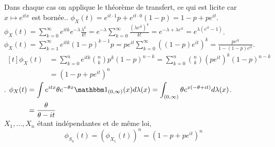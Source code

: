 \documentclass{report}
\begin{document}
\subsection{} \noindent{}\\ 
\\ 
\\
\noindent Dans chaque cas on applique le théorème de transfert, ce qui est licite car $x\mapsto e^{itx}$ est bornée.. $\phi_X(t)=e^{it\cdot 1}p + e^{it\cdot 0}(1-p)=1-p + pe^{it}$. $\phi_X(t)=\sum_{k=0}^\infty e^{itk} e^{-\lambda} \frac{\lambda^k}{k!}=e^{-\lambda} \sum_{k=0}^\infty \frac{(\lambda e^{it})^k}{k!}=e^{-\lambda+\lambda e^{it}}=e^{\lambda(e^{it}-1)}$. $\phi_X(t)=\sum_{k=1}^\infty e^{itk} (1-p)^{k-1}p= pe^{it}\sum_{k=0}^\infty ((1-p)e^{it})^k=\frac{pe^{it}}{1-(1-p)e^{it}}$. $\begin{aligned}[t] \phi_X(t)&=\sum_{k=0}^n e^{itk} \binom{n}k p^k(1-p)^{n-k} = \sum_{k=0}^n \binom{n}k (pe^{it})^k(1-p)^{n-k} \\&= (1-p+pe^{it})^n \end{aligned}$. $\begin{aligned}[t] \phi_X(t)&= \int e^{itx}\theta e^{-\theta x} \mathbbm 1_{(0,\infty)}(x) d\lambda(x) 
= \int_{(0,\infty)} \theta e^{x(-\theta +it)}d\lambda(x) \\
&=\frac{\theta}{\theta -it}
\end{aligned}$. $X_1,\ldots,X_n$ étant indépendantes et de même loi, $$\phi_{S_n}(t)=(\phi_{X_1}(t))^n = (1-p + pe^{it})^n $$
\end{document}
